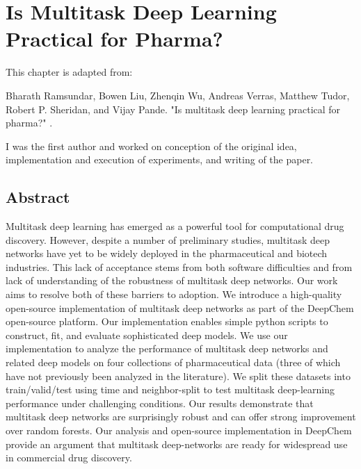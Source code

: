 \section{Is Multitask Deep Learning Practical for Pharma?}

This chapter is adapted from: 

Bharath Ramsundar, Bowen Liu, Zhenqin Wu, Andreas Verras, Matthew Tudor, Robert P. Sheridan, and Vijay Pande. "Is multitask deep learning practical for pharma?"  \cite{ramsundar2017multitask}.

I was the first author and worked on conception of the original idea, implementation and execution of experiments, and writing of the paper.



\subsection{Abstract}
Multitask deep learning has emerged as a powerful tool for computational drug discovery. However, despite a number of preliminary studies, multitask deep networks have yet to be widely deployed in the pharmaceutical and biotech industries. This lack of acceptance stems from both software difficulties and from lack of understanding of the robustness of multitask deep networks. Our work aims to resolve both of these barriers to adoption. We introduce a high-quality open-source implementation of multitask deep networks as part of the DeepChem open-source platform. Our implementation enables simple python scripts to construct, fit, and evaluate sophisticated deep models. We use our implementation to analyze the performance of multitask deep networks and related deep models on four collections of pharmaceutical data (three of which have not previously been analyzed in the literature). We split these datasets into train/valid/test using time and neighbor-split to test multitask deep-learning performance under challenging conditions. Our results demonstrate that multitask deep networks are surprisingly robust and can offer strong improvement over random forests. Our analysis and open-source implementation in DeepChem provide an argument that multitask deep-networks are ready for widespread use in commercial drug discovery. 



